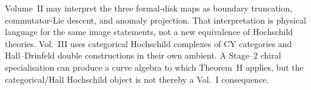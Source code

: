 \begin{remark}
\label{rem:three-hochschild-propagation}
Volume~II may interpret the three formal-disk maps as boundary
truncation, commutator-Lie descent, and anomaly projection. That
interpretation is physical language for the same image statements, not
a new equivalence of Hochschild theories. Vol.~III uses categorical
Hochschild complexes of CY categories and Hall--Drinfeld double
constructions in their own ambient. A Stage--2 chiral specialisation
can produce a curve algebra to which Theorem~H applies, but the
categorical/Hall Hochschild object is not thereby a Vol.~I
consequence.
\end{remark}
